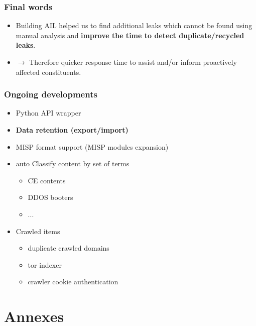 \documentclass{beamer}
\begin{document}
\begin{frame}
   \frametitle{Final words}
   \begin{itemize}
        \item Building AIL helped us to find additional leaks which cannot be found using manual analysis and {\bf improve the time to detect duplicate/recycled leaks}.
            \vskip0.5cm
        \item[] $\rightarrow$ Therefore quicker response time to assist and/or inform proactively affected constituents.
   \end{itemize}
\end{frame}



\begin{frame}
    \frametitle{Ongoing developments}
        \begin{itemize}
            \item Python API wrapper
            \item {\bf Data retention (export/import)}
            \item MISP format support (MISP modules expansion)
            \item auto Classify content by set of terms
            \begin{itemize}
            	\item CE contents
            	\item DDOS booters
            	\item ...
            \end{itemize}
            \item Crawled items
            \begin{itemize}
            	\item duplicate crawled domains
            	\item tor indexer
            	\item crawler cookie authentication
            \end{itemize}
        \end{itemize}
\end{frame}


\section{Annexes}


\end{document}
